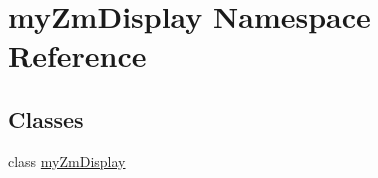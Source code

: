 \hypertarget{namespacemy_zm_display}{\section{my\-Zm\-Display Namespace Reference}
\label{namespacemy_zm_display}
}
\subsection*{Classes}
\begin{DoxyCompactItemize}
\item 
class \hyperlink{classmy_zm_display_1_1my_zm_display}{my\-Zm\-Display}
\end{DoxyCompactItemize}
